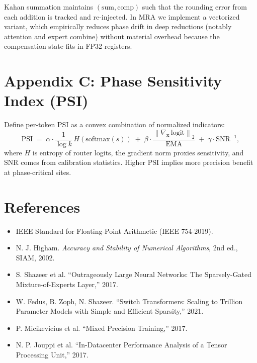 \documentclass[11pt]{article}
\newcommand{\norm}[1]{\left\lVert #1 \right\rVert}
\newcommand{\bfx}{\mathbf{x}}
\theoremstyle{plain}
\theoremstyle{definition}
\begin{document}
Kahan summation maintains $(\mathrm{sum},\mathrm{comp})$ such that the rounding error from each addition is tracked and re-injected. In MRA we implement a vectorized variant, which empirically reduces phase drift in deep reductions (notably attention and expert combine) without material overhead because the compensation state fits in FP32 registers.

\section{Appendix C: Phase Sensitivity Index (PSI)}

Define per-token $\mathrm{PSI}$ as a convex combination of normalized indicators:
\[
\mathrm{PSI} \;=\; \alpha \cdot \frac{1}{\log k}\,H(\mathrm{softmax}(s))
\;+\; \beta \cdot \frac{\norm{\nabla_{\bfx}\, \mathrm{logit}}_2}{\mathrm{EMA}}
\;+\; \gamma \cdot \mathrm{SNR}^{-1}\!,
\]
where $H$ is entropy of router logits, the gradient norm proxies sensitivity, and $\mathrm{SNR}$ comes from calibration statistics. Higher $\mathrm{PSI}$ implies more precision benefit at phase-critical sites.

\section*{References}
\vspace{-0.5em}
\begin{itemize}\setlength\itemsep{0.25em}
  \item IEEE Standard for Floating-Point Arithmetic (IEEE 754-2019).
  \item N. J. Higham. \textit{Accuracy and Stability of Numerical Algorithms}, 2nd ed., SIAM, 2002.
  \item S. Shazeer et al. ``Outrageously Large Neural Networks: The Sparsely-Gated Mixture-of-Experts Layer,'' 2017.
  \item W. Fedus, B. Zoph, N. Shazeer. ``Switch Transformers: Scaling to Trillion Parameter Models with Simple and Efficient Sparsity,'' 2021.
  \item P. Micikevicius et al. ``Mixed Precision Training,'' 2017.
  \item N. P. Jouppi et al. ``In-Datacenter Performance Analysis of a Tensor Processing Unit,'' 2017.
\end{itemize}
\end{document}
